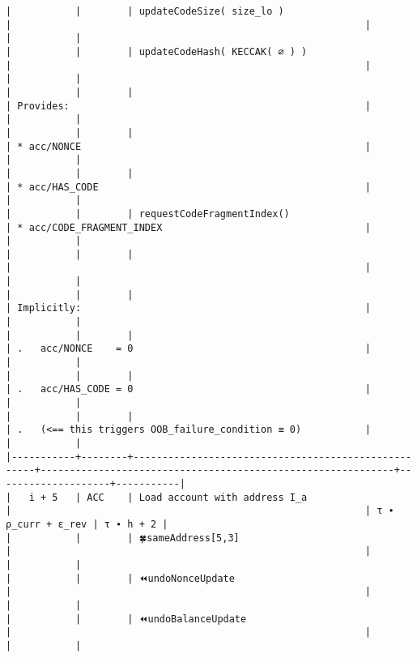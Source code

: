 \documentclass[varwidth=\maxdimen,margin=0.5cm,multi={verbatim}]{standalone}
\begin{document}
\begin{verbatim}
|           |        | updateCodeSize( size_lo )                           |                                                             |                    |           |
|           |        | updateCodeHash( KECCAK( ∅ ) )                       |                                                             |                    |           |
|           |        |                                                     | Provides:                                                   |                    |           |
|           |        |                                                     | * acc/NONCE                                                 |                    |           |
|           |        |                                                     | * acc/HAS_CODE                                              |                    |           |
|           |        | requestCodeFragmentIndex()                          | * acc/CODE_FRAGMENT_INDEX                                   |                    |           |
|           |        |                                                     |                                                             |                    |           |
|           |        |                                                     | Implicitly:                                                 |                    |           |
|           |        |                                                     | .   acc/NONCE    = 0                                        |                    |           |
|           |        |                                                     | .   acc/HAS_CODE = 0                                        |                    |           |
|           |        |                                                     | .   (<== this triggers OOB_failure_condition ≡ 0)           |                    |           |
|-----------+--------+-----------------------------------------------------+-------------------------------------------------------------+--------------------+-----------|
|   i + 5   | ACC    | Load account with address I_a                       |                                                             | τ ∙ ρ_curr + ε_rev | τ ∙ h + 2 |
|           |        | 🍀sameAddress[5,3]                                  |                                                             |                    |           |
|           |        | ⏪undoNonceUpdate                                   |                                                             |                    |           |
|           |        | ⏪undoBalanceUpdate                                 |                                                             |                    |           |

\end{verbatim}
\end{document}
